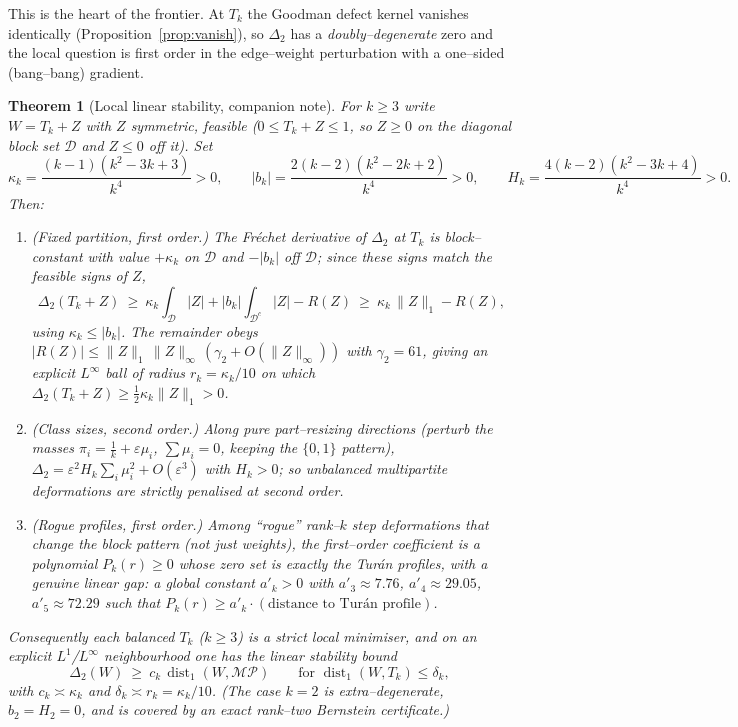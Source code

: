 \documentclass[11pt]{article}
\newtheorem{theorem}{Theorem}[section]
\theoremstyle{definition}
\newcommand{\dist}{\operatorname{dist}}
\newcommand{\MP}{\mathcal{MP}}
\newcommand{\Tk}{T_k}
\newcommand{\Linf}[1]{\lVert #1\rVert_\infty}
\newcommand{\Lone}[1]{\lVert #1\rVert_1}
\begin{document}
This is the heart of the frontier.  At $\Tk$ the Goodman defect kernel vanishes
identically (Proposition~\ref{prop:vanish}), so $\Delta_2$ has a
\emph{doubly--degenerate} zero and the local question is first order in the
edge--weight perturbation with a one--sided (bang--bang) gradient.

\begin{theorem}[Local linear stability, {\rm companion note}]\label{thm:local}
For $k\ge3$ write $W=\Tk+Z$ with $Z$ symmetric, feasible ($0\le\Tk+Z\le1$, so
$Z\ge0$ on the diagonal block set $\mathcal D$ and $Z\le0$ off it).  Set
\[
  \kappa_k=\frac{(k-1)(k^2-3k+3)}{k^4}>0,\qquad
  |b_k|=\frac{2(k-2)(k^2-2k+2)}{k^4}>0,\qquad
  H_k=\frac{4(k-2)(k^2-3k+4)}{k^4}>0 .
\]
Then:
\begin{enumerate}[label=\textup{(\alph*)}]
\item \emph{(Fixed partition, first order.)}  The Fr\'echet derivative of
$\Delta_2$ at $\Tk$ is block--constant with value $+\kappa_k$ on $\mathcal D$ and
$-|b_k|$ off $\mathcal D$; since these signs match the feasible signs of $Z$,
\[
  \Delta_2(\Tk+Z)\ \ge\ \kappa_k\!\int_{\mathcal D}|Z|+|b_k|\!\int_{\mathcal D^c}|Z|
   -R(Z)\ \ge\ \kappa_k\,\Lone Z-R(Z),
\]
using $\kappa_k\le|b_k|$.  The remainder obeys
$|R(Z)|\le\Lone Z\,\Linf Z\,(\gamma_2+O(\Linf Z))$ with $\gamma_2=61$, giving an
explicit $L^\infty$ ball of radius $r_k=\kappa_k/10$ on which
$\Delta_2(\Tk+Z)\ge\tfrac12\kappa_k\Lone Z>0$.
\item \emph{(Class sizes, second order.)}  Along pure part--resizing directions
(perturb the masses $\pi_i=\tfrac1k+\varepsilon\mu_i$, $\sum\mu_i=0$, keeping the
$\{0,1\}$ pattern), $\Delta_2=\varepsilon^2 H_k\sum_i\mu_i^2+O(\varepsilon^3)$ with
$H_k>0$; so unbalanced multipartite deformations are strictly penalised at second
order.
\item \emph{(Rogue profiles, first order.)}  Among ``rogue'' rank--$k$ step
deformations that change the block \emph{pattern} (not just weights), the
first--order coefficient is a polynomial $P_k(r)\ge0$ whose zero set is exactly the
Turán profiles, with a genuine \emph{linear} gap: a global constant
$a'_k>0$ with $a'_3\approx7.76$, $a'_4\approx29.05$, $a'_5\approx72.29$ such that
$P_k(r)\ge a'_k\cdot(\text{distance to Turán profile})$.
\end{enumerate}
Consequently each balanced $\Tk$ ($k\ge3$) is a strict local minimiser, and on an
explicit $L^1$/$L^\infty$ neighbourhood one has the \emph{linear} stability bound
\begin{equation}\label{eq:locallin}
  \Delta_2(W)\ \ge\ c_k\,\dist_1(W,\MP)\qquad\text{for }\dist_1(W,\Tk)\le\delta_k,
\end{equation}
with $c_k\asymp\kappa_k$ and $\delta_k\asymp r_k=\kappa_k/10$.  \textup{(}The case
$k=2$ is extra--degenerate, $b_2=H_2=0$, and is covered by an exact rank--two
Bernstein certificate.\textup{)}
\end{theorem}
\end{document}
